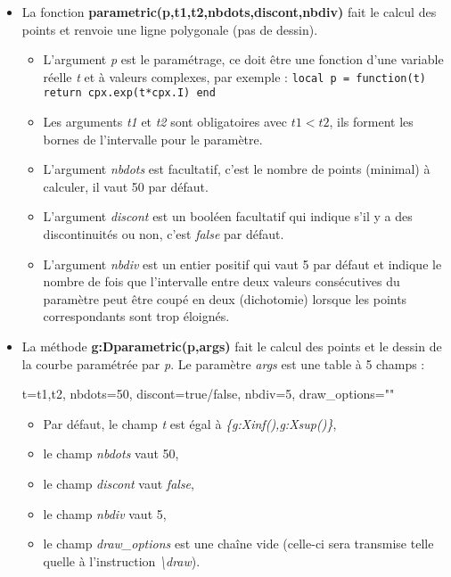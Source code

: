 \begin{itemize}
\item La fonction \textbf{parametric(p,t1,t2,nbdots,discont,nbdiv)} fait le calcul des points et renvoie une ligne polygonale (pas de dessin).
  \begin{itemize}
    \item L'argument \emph{p} est le paramétrage, ce doit être une fonction d'une variable réelle \emph{t} et à valeurs complexes, par exemple :
    \texttt{local p = function(t) return cpx.exp(t*cpx.I) end}
    \item  Les arguments \emph{t1} et \emph{t2} sont obligatoires avec \(t1 < t2\), ils forment les bornes de l'intervalle pour le paramètre.
    \item L'argument \emph{nbdots} est facultatif, c'est le nombre de points (minimal) à calculer, il vaut 50 par défaut.
    \item L'argument \emph{discont} est un booléen facultatif qui indique s'il y a des discontinuités ou non, c'est \emph{false} par défaut.
    \item L'argument \emph{nbdiv} est un entier positif qui vaut 5 par défaut et indique le nombre de fois que l'intervalle entre deux valeurs consécutives du paramètre peut être coupé en deux (dichotomie) lorsque les points correspondants sont trop éloignés.
  \end{itemize}
  
\item La méthode \textbf{g:Dparametric(p,args)} fait le calcul des points et le dessin de la courbe paramétrée par \emph{p}. Le paramètre \emph{args} est une table à 5 champs :

\begin{TeXcode}
 { t={t1,t2}, nbdots=50, discont=true/false, nbdiv=5, draw_options="" }
\end{TeXcode}

  \begin{itemize}
      \item Par défaut, le champ \emph{t} est égal à \emph{\{g:Xinf(),g:Xsup()\}},
      \item le champ \emph{nbdots} vaut 50, 
      \item le champ \emph{discont} vaut \emph{false},
      \item le champ \emph{nbdiv} vaut 5,
      \item le champ \emph{draw\_options} est une chaîne vide (celle-ci sera transmise telle quelle à l'instruction \emph{\textbackslash draw}).
  \end{itemize}
\end{itemize}  

